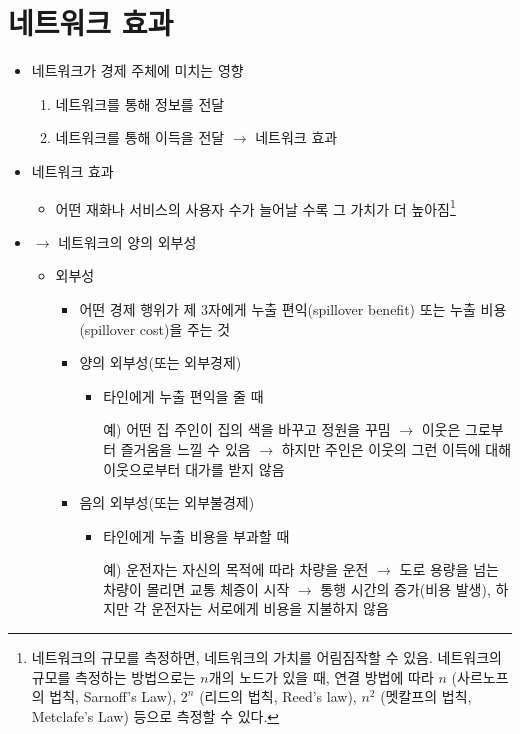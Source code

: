 \section{네트워크 효과}
\begin{itemize}
\item 네트워크가 경제 주체에 미치는 영향
	\begin{enumerate}
	\item 네트워크를 통해 정보를 전달
	\item 네트워크를 통해 이득을 전달 $\rightarrow$ 네트워크 효과
	\end{enumerate}
\item 네트워크 효과
	\begin{itemize}
	\item 어떤 재화나 서비스의 사용자 수가 늘어날 수록 그 가치가 더 높아짐\footnote{네트워크의 규모를 측정하면, 네트워크의 가치를 어림짐작할 수 있음. 네트워크의 규모를 측정하는 방법으로는 $n$개의 노드가 있을 때, 연결 방법에 따라 $n$ (사르노프의 법칙, Sarnoff's Law), $2^{n}$ (리드의 법칙, Reed's law), $n^{2}$ (멧칼프의 법칙, Metclafe's Law) 등으로 측정할 수 있다.}
	\end{itemize}	
\item $\rightarrow$ 네트워크의 양의 외부성
	\begin{itemize}
	\item 외부성
		\begin{itemize}
		\item 어떤 경제 행위가 제 3자에게 누출 편익(spillover benefit) 또는 누출 비용(spillover cost)을 주는 것
		\item 양의 외부성(또는 외부경제)
			\begin{itemize}
			\item 타인에게 누출 편익을 줄 때
			\item[예)] 어떤 집 주인이 집의 색을 바꾸고 정원을 꾸밈 $\rightarrow$ 이웃은 그로부터 즐거움을 느낄 수 있음 $\rightarrow$ 하지만 주인은 이웃의 그런 이득에 대해 이웃으로부터 대가를 받지 않음
			\end{itemize}
		\item 음의 외부성(또는 외부불경제)
			\begin{itemize}
			\item 타인에게 누출 비용을 부과할 때
			\item[예)] 운전자는 자신의 목적에 따라 차량을 운전 $\rightarrow$ 도로 용량을 넘는 차량이 몰리면 교통 체증이 시작 $\rightarrow$ 통행 시간의 증가(비용 발생), 하지만 각 운전자는 서로에게 비용을 지불하지 않음
			\end{itemize}

\end{itemize}
\end{itemize}
\end{itemize}
